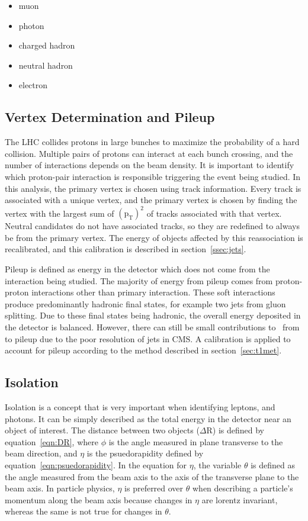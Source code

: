 \begin{itemize}
\item muon          
\item photon        
\item charged hadron
\item neutral hadron
\item electron      
\end{itemize}

\subsection{Vertex Determination and Pileup}
\label{ssec:vtxandpileup}
The LHC collides protons in large bunches to maximize the probability of a hard collision.
Multiple pairs of protons can interact at each bunch crossing, and the number of interactions depends on the beam density.
It is important to identify which proton-pair interaction is responsible triggering the event being studied.
In this analysis, the primary vertex is chosen using track information.
Every track is associated with a unique vertex,
and the primary vertex is chosen by finding the vertex with the largest sum of $\mathrm{(p_{T})^{2}}$ of tracks associated with that vertex.
Neutral candidates do not have associated tracks, so they are redefined to always be from the primary vertex.
The energy of objects affected by this reassociation is recalibrated, and this calibration is described in section~\ref{ssec:jets}.

Pileup is defined as energy in the detector which does not come from the interaction being studied.
The majority of energy from pileup comes from proton-proton interactions other than primary interaction.
These soft interactions produce predominantly hadronic final states, for example two jets from  gluon splitting.
Due to these final states being hadronic, the overall energy deposited in the detector is balanced.
However, there can still be small contributions to \MET\ from to pileup due to the poor resolution of jets in CMS.
A calibration is applied to account for pileup according to the method described in section~\ref{sec:t1met}.

\subsection{Isolation}
\label{ssec:isolation_summary}
Isolation is a concept that is very important when identifying leptons, and photons.
It can be simply described as the total energy in the detector near an object of interest.
The distance between two objects ($\Delta$R) is defined by equation~\ref{eqn:DR},
where $\phi$ is the angle measured in plane transverse to the beam direction,
and $\eta$ is the psuedorapidity defined by equation~\ref{eqn:psuedorapidity}.
In the equation for $\eta$, the variable $\theta$ is defined as the angle measured from the beam axis to the axis of the transverse plane to the beam axis.
In particle physics, $\eta$ is preferred over $\theta$ when describing a particle's momentum along the beam axis because changes in $\eta$ are lorentz invariant,
whereas the same is not true for changes in $\theta$.

